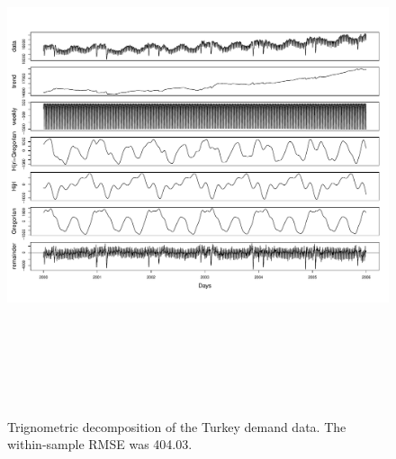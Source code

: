 \documentclass{uwstat572}
\begin{document}
\begin{figure}[]
\centering
  \includegraphics[width=\linewidth,height=6in]{tbatsDecompTelec.pdf}
  \caption{Trignometric decomposition of the Turkey demand data. The within-sample RMSE was 404.03.}
  \label{fig:tbatsDecompTelec}
\end{figure}
\end{document}

